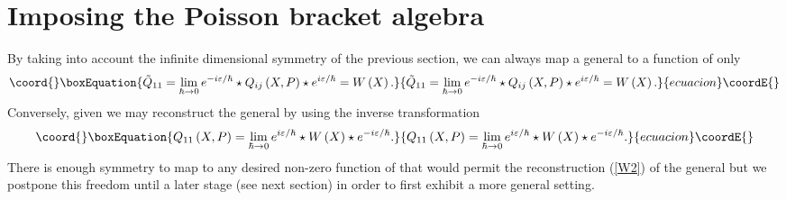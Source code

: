 \documentclass[a4paper,12pt]{article}
\begin{document}
\section{Imposing the Poisson bracket algebra}

By taking into account the infinite dimensional symmetry of the previous
section, we can always map a general \coordHE{} to a
function of only \coordHE{}%
\begin{equation}\coord{}\boxEquation{
\tilde{Q}_{11}=\lim_{\hbar \rightarrow 0}e^{-i\varepsilon /\hbar }\star
Q_{ij}\left( X,P\right) \star e^{i\varepsilon /\hbar }=W\left( X\right) .
\label{W1}
}{
\tilde{Q}_{11}=\lim_{\hbar \rightarrow 0}e^{-i\varepsilon /\hbar }\star
Q_{ij}\left( X,P\right) \star e^{i\varepsilon /\hbar }=W\left( X\right) .
}{ecuacion}\coordE{}\end{equation}
Conversely, given \coordHE{} we may reconstruct the
general \coordHE{} by using the inverse transformation
\begin{equation}\coord{}\boxEquation{
Q_{11}\left( X,P\right) =\lim_{\hbar \rightarrow 0}e^{i\varepsilon /\hbar
}\star W\left( X\right) \star e^{-i\varepsilon /\hbar }.  \label{W2}
}{
Q_{11}\left( X,P\right) =\lim_{\hbar \rightarrow 0}e^{i\varepsilon /\hbar
}\star W\left( X\right) \star e^{-i\varepsilon /\hbar }.  }{ecuacion}\coordE{}\end{equation}
There is enough symmetry to map \coordHE{} to any desired non-zero
function of \coordHE{} that would permit the reconstruction (\ref{W2}) of the
general \coordHE{} but we postpone this freedom until a
later stage (see next section) in order to first exhibit a more general
setting.
\end{document}
